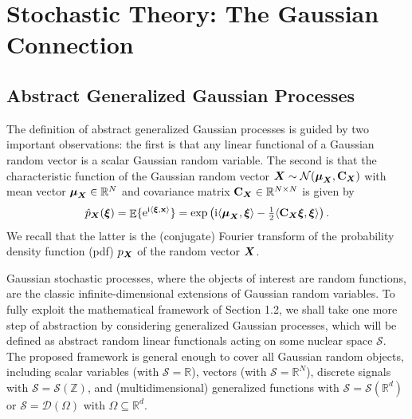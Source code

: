 \documentclass[11pt, english,english]{article}
\newcommand{\R}{ \mathbb{R}}
\newcommand{\Z}{ \mathbb{Z}}
\def\V#1{{\boldsymbol{#1}}}         %
\def\Spc#1{{\mathcal{#1}}}  %
\def\M#1{{\bf{#1}}}  %
\def\ee{\mathrm{e}}
\def\jj{\mathrm{i}}
\def\Exp{\mathop{\mathbb{E}}\nolimits}
\renewcommand{\[}{\begin{equation}}
\renewcommand{\]}[1]{\label{eq:#1}\end{equation}}
\def\Exp{\mathop{\mathbb{E}}\nolimits}
\def\VRand#1{{\uppercase{\boldsymbol #1}}}         %
\begin{document}
\section{Stochastic Theory: The Gaussian Connection}
\label{Sec:GGP}

\subsection{Abstract Generalized Gaussian Processes}
The definition of abstract generalized Gaussian processes is guided by two important observations: the first is that any linear functional of a Gaussian
random vector is a scalar Gaussian random variable. The second is that the characteristic function of the Gaussian random vector $\VRand X\sim\Spc N(\V \mu_{\VRand X},\M C_{\VRand X})$ with mean vector $\V \mu_{\VRand X}\in \R^N$ and covariance matrix  $\M C_{\VRand X}\in \R^{N \times N}$ is given 
by 
\begin{align}
\label{Eq:MultiGaussFourier}
\hat p_{\VRand X}(\V \xi)= \Exp\{\ee^{\jj \langle \V \xi, \M x\rangle}\}=\exp\left( \jj \langle \V \mu_{\VRand X},\V \xi\rangle - \tfrac{1}{2} \langle \M C_{\VRand X}\V \xi,\V \xi\rangle \right).
\end{align}
We recall that the latter is the (conjugate) Fourier transform of the probability density function (pdf) 
$p_{\VRand X}$ of the random vector $\VRand X$. 

Gaussian stochastic processes, where the objects of interest are random functions, are the classic infinite-dimensional extensions of Gaussian random variables.
To fully exploit the mathematical framework of Section 1.2, we shall take one more step of abstraction by considering generalized Gaussian processes, which will be defined as abstract random linear functionals acting on some nuclear space $\Spc S$. 
The proposed framework is general enough to cover all Gaussian random objects, including scalar variables (with $\Spc S=\R$), vectors (with $\Spc S=\R^N$), discrete signals with $\Spc S=\Spc S(\Z)$, and (multidimensional) generalized functions with $\Spc S=\Spc S(\R^d)$ or $\Spc S=\Spc D(\Omega)$ with $\Omega \subseteq \R^d$. 
\end{document}
